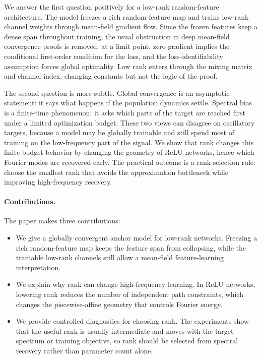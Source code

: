 \documentclass{article}
\begin{document}
We answer the first question positively for a low-rank random-feature architecture. The model freezes a rich random-feature map and trains low-rank channel weights through mean-field gradient flow. Since the frozen features keep a dense span throughout training, the usual obstruction in deep mean-field convergence proofs is removed: at a limit point, zero gradient implies the conditional first-order condition for the loss, and the loss-identifiability assumption forces global optimality. Low rank enters through the mixing matrix and channel index, changing constants but not the logic of the proof.

The second question is more subtle. Global convergence is an asymptotic statement: it says what happens if the population dynamics settle. Spectral bias is a finite-time phenomenon: it asks which parts of the target are reached first under a limited optimization budget. These two views can disagree on oscillatory targets, because a model may be globally trainable and still spend most of training on the low-frequency part of the signal. We show that rank changes this finite-budget behavior by changing the geometry of ReLU networks, hence which Fourier modes are recovered early. The practical outcome is a rank-selection rule: choose the smallest rank that avoids the approximation bottleneck while improving high-frequency recovery.

\paragraph{Contributions.}
The paper makes three contributions:
\begin{itemize}
\item We give a globally convergent anchor model for low-rank networks. Freezing a rich random-feature map keeps the feature span from collapsing, while the trainable low-rank channels still allow a mean-field feature-learning interpretation.
\item We explain why rank can change high-frequency learning. In ReLU networks, lowering rank reduces the number of independent path constraints, which changes the piecewise-affine geometry that controls Fourier energy.
\item We provide controlled diagnostics for choosing rank. The experiments show that the useful rank is usually intermediate and moves with the target spectrum or training objective, so rank should be selected from spectral recovery rather than parameter count alone.
\end{itemize}
\end{document}
